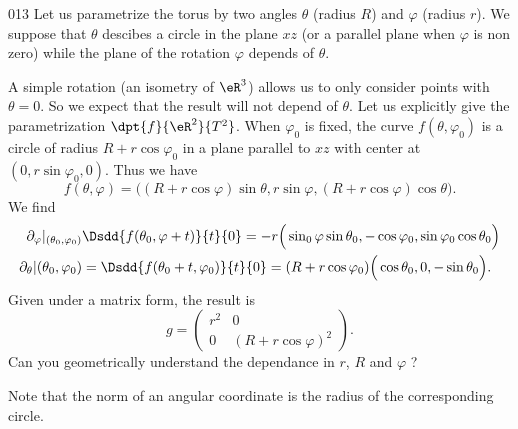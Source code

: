 \begin{corrige}{013}
Let us parametrize the torus by two angles $\theta$ (radius $R$) and $\varphi$ (radius $r$). We suppose that $\theta$ descibes a circle in the plane $xz$ (or a parallel plane when $\varphi$ is non zero) while the plane of the rotation $\varphi$ depends of $\theta$.

A simple rotation (an isometry of $\eR^3$) allows us to only consider points with $\theta=0$. So we expect that the result will not depend of $\theta$. Let us explicitly give the parametrization $\dpt{ f }{ \eR^2 }{ T^2 }$. When $\varphi_0$ is fixed, the curve $f(\theta,\varphi_0)$ is a circle of radius $R+r\cos\varphi_0$ in a plane parallel to $xz$ with center at $(0,r\sin\varphi_0,0)$. Thus we have
\begin{equation}
f(\theta,\varphi)=\Big( (R+r\cos\varphi)\sin\theta,r\sin\varphi,(R+r\cos\varphi)\cos\theta \Big).
\end{equation}
We find
\begin{subequations}
\begin{align}
\partial_{\varphi}|_{(\theta_0,\varphi_0)}&\Dsdd{ f(\theta_0,\varphi+t) }{t}{0}  =-r\Big( \sin_0\varphi\sin\theta_0,-\cos\varphi_0,\sin\varphi_0\cos\theta_0 \Big)\\
	\partial_{\theta}|{(\theta_0,\varphi_0)}&= \Dsdd{ f(\theta_0+t,\varphi_0) }{t}{0}  =(R+r\cos\varphi_0)\Big( \cos\theta_0,0,-\sin\theta_0 \Big).
\end{align}
\end{subequations}
Given under a matrix form, the result is
\[ 
  g=
\begin{pmatrix}
  r^2&0\\0&(R+r\cos\varphi)^2
\end{pmatrix}.
\]
Can you geometrically understand the dependance in $r$, $R$ and $\varphi$ ?

Note that the norm of an angular coordinate is the radius of the corresponding circle.

\end{corrige}
